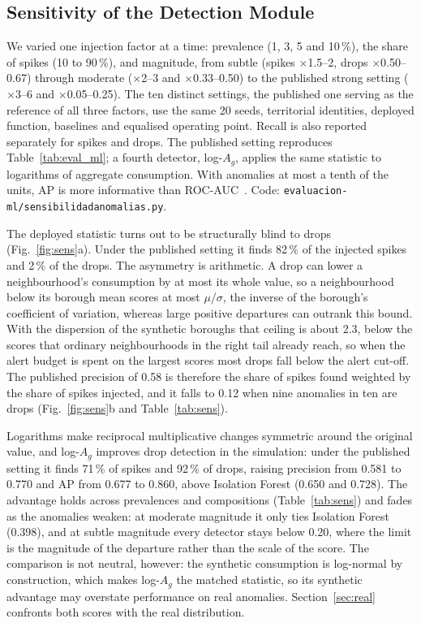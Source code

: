\documentclass[runningheads]{llncs}
\newenvironment{nuevobloque}{}{}
\renewcommand{\_}{\origunderscore\allowbreak}
\begin{document}
\begin{nuevobloque}
\subsection{Sensitivity of the Detection Module}
\label{sec:sens}

We varied one injection factor at a time: prevalence (1, 3, 5 and 10\,\%),
the share of spikes (10 to 90\,\%), and magnitude, from subtle (spikes
$\times$1.5--2, drops $\times$0.50--0.67) through moderate ($\times$2--3 and
$\times$0.33--0.50) to the published strong setting ($\times$3--6 and
$\times$0.05--0.25). The ten distinct settings, the published one serving as the
reference of all three factors, use the same 20 seeds, territorial identities,
deployed function, baselines and equalised operating point.
Recall is also reported separately for spikes and drops. The published setting
reproduces Table~\ref{tab:eval_ml}; a fourth detector, log-$A_g$, applies the
same statistic to logarithms of aggregate consumption. With anomalies at most a
tenth of the units, AP is more informative than ROC-AUC~\cite{saito2015}.
Code: \texttt{evaluacion-ml/sensibilidad\_anomalias.py}.

The deployed statistic turns out to be structurally blind to drops
(Fig.~\ref{fig:sens}a). Under the published setting it finds 82\,\% of the
injected spikes and 2\,\% of the drops. The asymmetry is arithmetic. A drop can lower a neighbourhood's consumption by at most its whole
value, so a neighbourhood below its borough mean scores at most
$\mu/\sigma$, the inverse of the borough's coefficient of variation, whereas large
positive departures can outrank this bound. With the dispersion of the synthetic boroughs that
ceiling is about 2.3, below the scores that ordinary neighbourhoods in the right
tail already reach, so when the alert budget is spent on the largest scores most
drops fall below the alert cut-off. The published precision of 0.58 is therefore the share
of spikes found weighted by the share of spikes injected, and it falls to 0.12
when nine anomalies in ten are drops (Fig.~\ref{fig:sens}b and
Table~\ref{tab:sens}).

Logarithms make reciprocal multiplicative changes symmetric around the original
value, and log-$A_g$ improves drop detection in the simulation: under
the published setting it finds 71\,\% of spikes and 92\,\% of drops, raising
precision from 0.581 to 0.770 and AP from
0.677 to 0.860, above Isolation Forest (0.650 and 0.728). The advantage holds
across prevalences and compositions (Table~\ref{tab:sens}) and fades as the
anomalies weaken: at moderate magnitude it only ties Isolation Forest (0.398), and
at subtle magnitude every detector stays below 0.20, where the limit is the
magnitude of the departure rather than the scale of the score. The comparison is
not neutral, however: the synthetic consumption is log-normal by construction,
which makes log-$A_g$ the matched statistic, so its synthetic advantage may overstate performance on real anomalies. Section~\ref{sec:real} confronts both scores with the real distribution.


\end{nuevobloque}
\end{document}
